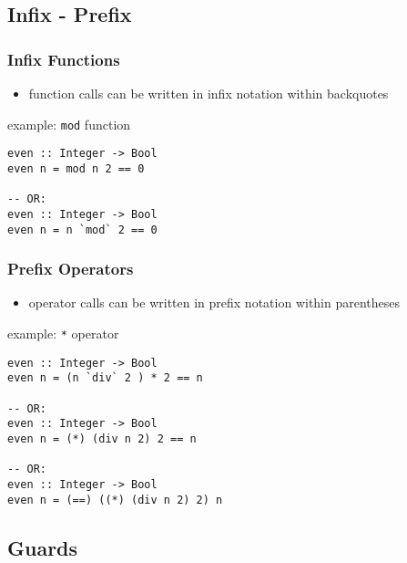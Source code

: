 \documentclass[dvipsnames]{beamer}
\theoremstyle{plain}
\begin{document}
\subsection{Infix - Prefix}

\begin{frame}[fragile]
  \frametitle{Infix Functions}

  \begin{itemize}
    \item function calls can be written in infix notation within backquotes
  \end{itemize}

  \begin{exampleblock}{example: \lstinline{mod} function}
    \begin{lstlisting}
even :: Integer -> Bool
even n = mod n 2 == 0

-- OR:
even :: Integer -> Bool
even n = n `mod` 2 == 0
    \end{lstlisting}
  \end{exampleblock}
\end{frame}

\begin{frame}[fragile]
  \frametitle{Prefix Operators}

  \begin{itemize}
    \item operator calls can be written in prefix notation within parentheses
  \end{itemize}

  \begin{exampleblock}{example: \lstinline{*} operator}
    \begin{lstlisting}
even :: Integer -> Bool
even n = (n `div` 2 ) * 2 == n

-- OR:
even :: Integer -> Bool
even n = (*) (div n 2) 2 == n

-- OR:
even :: Integer -> Bool
even n = (==) ((*) (div n 2) 2) n
    \end{lstlisting}
  \end{exampleblock}
\end{frame}

\subsection{Guards}
\end{document}
